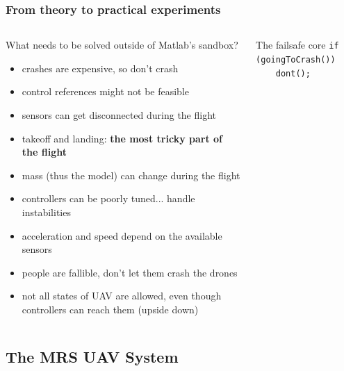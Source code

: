 \documentclass[aspectratio=1610]{beamer}
\begin{document}

  \begin{frame}
    \frametitle{From theory to practical experiments}

    \begin{columns}[c]

      \begin{block}{What needs to be solved outside of Matlab's sandbox?}
        \begin{itemize}
          \item crashes are expensive, so don't crash
          \item control references might not be feasible
          \item sensors can get disconnected during the flight
          \item takeoff and landing: \textbf{the most tricky part of the flight}
          \item mass (thus the model) can change during the flight
          \item controllers can be poorly tuned... handle instabilities
          \item acceleration and speed depend on the available sensors
          \item people are fallible, don't let them crash the drones
          \item not all states of UAV are allowed, even though controllers can reach them (upside down)
        \end{itemize}
      \end{block}

      \begin{block}{The failsafe core}
        \texttt{if (goingToCrash())}\\
        \texttt{~~~~dont();}
      \end{block}

    \end{columns}

  \end{frame}



  \subsection{The MRS UAV System}
\end{document}
